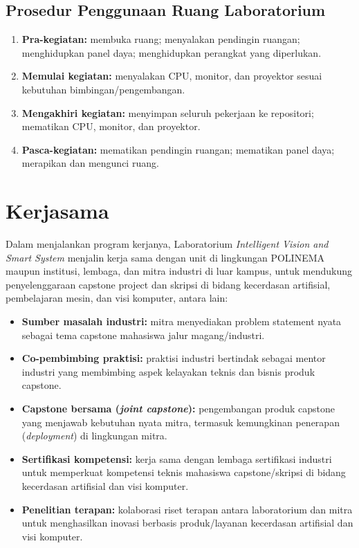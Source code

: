 \documentclass[12pt,a4paper]{report}
\begin{document}
\section{Prosedur Penggunaan Ruang Laboratorium}
\begin{enumerate}
\item \textbf{Pra-kegiatan:} membuka ruang; menyalakan pendingin ruangan; menghidupkan panel daya; menghidupkan perangkat yang diperlukan.
\item \textbf{Memulai kegiatan:} menyalakan CPU, monitor, dan proyektor sesuai kebutuhan bimbingan/pengembangan.
\item \textbf{Mengakhiri kegiatan:} menyimpan seluruh pekerjaan ke repositori; mematikan CPU, monitor, dan proyektor.
\item \textbf{Pasca-kegiatan:} mematikan pendingin ruangan; mematikan panel daya; merapikan dan mengunci ruang.
\end{enumerate}

\chapter{Kerjasama}

Dalam menjalankan program kerjanya, Laboratorium \emph{Intelligent Vision and Smart System} menjalin kerja sama dengan unit di lingkungan POLINEMA maupun institusi, lembaga, dan mitra industri di luar kampus, untuk mendukung penyelenggaraan capstone project dan skripsi di bidang kecerdasan artifisial, pembelajaran mesin, dan visi komputer, antara lain:
\begin{itemize}
\item \textbf{Sumber masalah industri:} mitra menyediakan problem statement nyata sebagai tema capstone mahasiswa jalur magang/industri.
\item \textbf{Co-pembimbing praktisi:} praktisi industri bertindak sebagai mentor industri yang membimbing aspek kelayakan teknis dan bisnis produk capstone.
\item \textbf{Capstone bersama (\emph{joint capstone}):} pengembangan produk capstone yang menjawab kebutuhan nyata mitra, termasuk kemungkinan penerapan (\emph{deployment}) di lingkungan mitra.
\item \textbf{Sertifikasi kompetensi:} kerja sama dengan lembaga sertifikasi industri untuk memperkuat kompetensi teknis mahasiswa capstone/skripsi di bidang kecerdasan artifisial dan visi komputer.
\item \textbf{Penelitian terapan:} kolaborasi riset terapan antara laboratorium dan mitra untuk menghasilkan inovasi berbasis produk/layanan kecerdasan artifisial dan visi komputer.
\end{itemize}

\PedomanPengesahan
\end{document}
